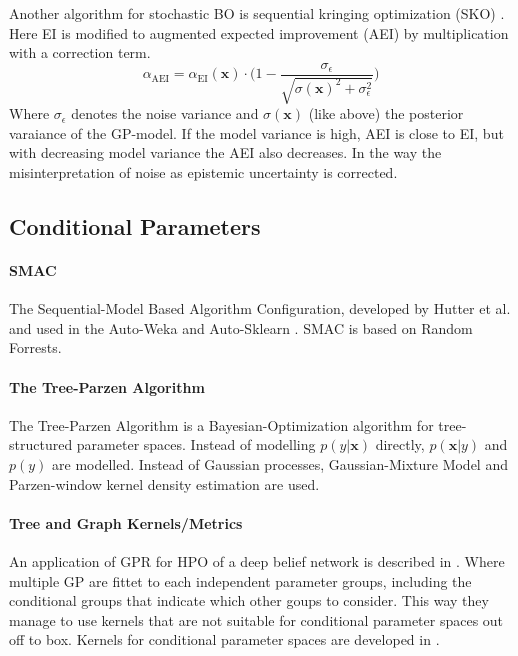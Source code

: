 \documentclass[english]{article}
\newcommand{\EI}{\operatorname{EI}}
\newcommand{\x}{\mathbf{x}}
\begin{document}
Another algorithm for stochastic BO is sequential kringing optimization (SKO) \cite{huang_global_2006}. Here EI is modified to augmented expected improvement (AEI) by multiplication with a correction term.
\begin{equation}
  \alpha_{\operatorname{AEI}} = \alpha_{\EI}(\x) \cdot \bigg(1 - \frac{\sigma_\epsilon}{\sqrt{\sigma(\x)^2 + \sigma_\epsilon^2}}\bigg)
\end{equation}
Where $\sigma_\epsilon$ denotes the noise variance and $\sigma(\x)$ (like above) the posterior varaiance of the GP-model. If the model variance is high, AEI is close to EI, but with decreasing model variance the AEI also decreases. In the way the misinterpretation of noise as epistemic uncertainty is corrected.


\subsection{Conditional Parameters}

\paragraph{SMAC}
The Sequential-Model Based Algorithm Configuration, developed by Hutter et al. and used in the Auto-Weka \cite{thornton_auto-weka:_2013} and Auto-Sklearn \cite{feurer_efficient_2015}. SMAC is based on Random Forrests.

\paragraph{The Tree-Parzen Algorithm}
The Tree-Parzen Algorithm \cite{bergstra_algorithms_2011} is a Bayesian-Optimization algorithm for tree-structured parameter spaces. Instead of modelling $p(y|\x)$ directly, $p(\x|y)$ and $p(y)$ are modelled. Instead of Gaussian processes, Gaussian-Mixture Model and Parzen-window kernel density estimation are used.

\paragraph{Tree and Graph Kernels/Metrics}
An application of GPR for HPO of a deep belief network is described in \cite{bergstra_algorithms_2011}. Where multiple GP are fittet to each independent parameter groups, including the conditional groups that indicate which other goups to consider. This way they manage to use kernels that are not suitable for conditional parameter spaces out off to box. Kernels for conditional parameter spaces are developed in \cite{swersky_raiders_2014, chandar_hierarchical_2016}.
\end{document}
